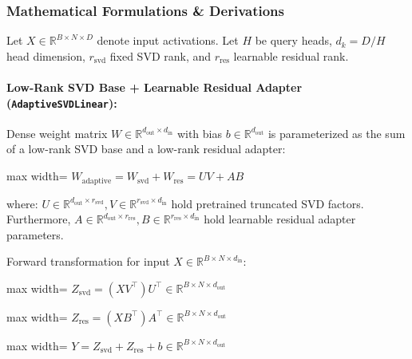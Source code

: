 \subsubsection*{Mathematical Formulations \& Derivations}

Let $X \in \mathbb{R}^{B \times N \times D}$ denote input activations. Let $H$ be query heads, $d_k = D / H$ head dimension, $r_{\text{svd}}$ fixed SVD rank, and $r_{\text{res}}$ learnable residual rank.

\paragraph{Low-Rank SVD Base + Learnable Residual Adapter (\texttt{AdaptiveSVDLinear}):}
Dense weight matrix $W \in \mathbb{R}^{d_{\text{out}} \times d_{\text{in}}}$ with bias $b \in \mathbb{R}^{d_{\text{out}}}$ is parameterized as the sum of a low-rank SVD base and a low-rank residual adapter:

\begin{center}
\begin{adjustbox}{max width=\columnwidth}
$\displaystyle
W_{\text{adaptive}} = W_{\text{svd}} + W_{\text{res}} = U V + A B
$
\end{adjustbox}
\end{center}

where:
$U \in \mathbb{R}^{d_{\text{out}} \times r_{\text{svd}}}, V \in \mathbb{R}^{r_{\text{svd}} \times d_{\text{in}}}$ hold pretrained truncated SVD factors. Furthermore, $A \in \mathbb{R}^{d_{\text{out}} \times r_{\text{res}}}, B \in \mathbb{R}^{r_{\text{res}} \times d_{\text{in}}}$ hold learnable residual adapter parameters.


Forward transformation for input $X \in \mathbb{R}^{B \times N \times d_{\text{in}}}$:

\begin{center}
\begin{adjustbox}{max width=\columnwidth}
$\displaystyle
Z_{\text{svd}} = (X V^\top) U^\top \in \mathbb{R}^{B \times N \times d_{\text{out}}}
$
\end{adjustbox}
\end{center}
\begin{center}
\begin{adjustbox}{max width=\columnwidth}
$\displaystyle
Z_{\text{res}} = (X B^\top) A^\top \in \mathbb{R}^{B \times N \times d_{\text{out}}}
$
\end{adjustbox}
\end{center}
\begin{center}
\begin{adjustbox}{max width=\columnwidth}
$\displaystyle
Y = Z_{\text{svd}} + Z_{\text{res}} + b \in \mathbb{R}^{B \times N \times d_{\text{out}}}
$
\end{adjustbox}
\end{center}

